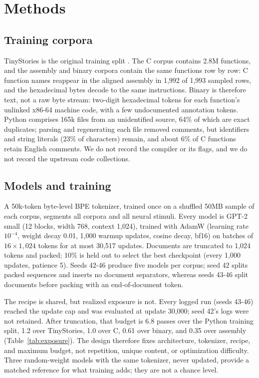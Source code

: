 \documentclass[mlmain]{jmlr}
\begin{document}
\section{Methods}
\label{sec:methods}

\subsection{Training corpora}
\label{sec:corpora}

TinyStories is the original training split \citep{eldan2023tinystories}. The C corpus contains 2.8M functions, and the assembly and binary corpora contain the same functions row by row: C function names reappear in the aligned assembly in 1,992 of 1,993 sampled rows, and the hexadecimal bytes decode to the same instructions. Binary is therefore text, not a raw byte stream: two-digit hexadecimal tokens for each function's unlinked x86-64 machine code, with a few undocumented annotation tokens. Python comprises 165k files from an unidentified source, 64\% of which are exact duplicates; parsing and regenerating each file removed comments, but identifiers and string literals (23\% of characters) remain, and about 6\% of C functions retain English comments. We do not record the compiler or its flags, and we do not record the upstream code collections.

\subsection{Models and training}
\label{sec:training}

A 50k-token byte-level BPE tokenizer, trained once on a shuffled 50MB sample of each corpus, segments all corpora and all neural stimuli. Every model is GPT-2 small \citep{radford2019gpt2} (12 blocks, width 768, context 1,024), trained with AdamW \citep{loshchilov2019adamw} (learning rate $10^{-4}$, weight decay 0.01, 1,000 warmup updates, cosine decay, bf16) on batches of $16\times1{,}024$ tokens for at most 30,517 updates. Documents are truncated to 1,024 tokens and packed; 10\% is held out to select the best checkpoint (every 1,000 updates, patience 5). Seeds 42-46 produce five models per corpus; seed 42 splits packed sequences and inserts no document separators, whereas seeds 43-46 split documents before packing with an end-of-document token.

The recipe is shared, but realized exposure is not. Every logged run (seeds 43-46) reached the update cap and was evaluated at update 30,000; seed 42's logs were not retained. After truncation, that budget is 6.8 passes over the Python training split, 1.2 over TinyStories, 1.0 over C, 0.61 over binary, and 0.35 over assembly (Table~\ref{tab:exposure}). The design therefore fixes architecture, tokenizer, recipe, and maximum budget, not repetition, unique content, or optimization difficulty. Three random-weight models with the same tokenizer, never updated, provide a matched reference for what training adds; they are not a chance level.
\end{document}
